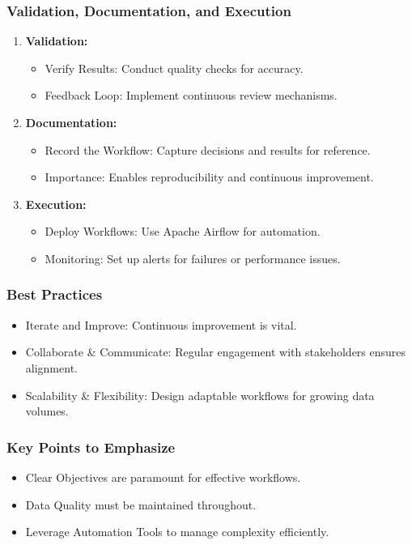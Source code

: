 \documentclass[aspectratio=169]{beamer}
\begin{document}
\begin{frame}[fragile]
    \frametitle{Validation, Documentation, and Execution}
    \begin{enumerate}[resume]
        \item \textbf{Validation:}
        \begin{itemize}
            \item Verify Results: Conduct quality checks for accuracy.
            \item Feedback Loop: Implement continuous review mechanisms.
        \end{itemize}

        \item \textbf{Documentation:}
        \begin{itemize}
            \item Record the Workflow: Capture decisions and results for reference.
            \item Importance: Enables reproducibility and continuous improvement.
        \end{itemize}

        \item \textbf{Execution:}
        \begin{itemize}
            \item Deploy Workflows: Use Apache Airflow for automation.
            \item Monitoring: Set up alerts for failures or performance issues.
        \end{itemize}
    \end{enumerate}
\end{frame}

\begin{frame}[fragile]
    \frametitle{Best Practices}
    \begin{itemize}
        \item Iterate and Improve: Continuous improvement is vital.
        \item Collaborate \& Communicate: Regular engagement with stakeholders ensures alignment.
        \item Scalability \& Flexibility: Design adaptable workflows for growing data volumes.
    \end{itemize}
\end{frame}

\begin{frame}[fragile]
    \frametitle{Key Points to Emphasize}
    \begin{itemize}
        \item Clear Objectives are paramount for effective workflows.
        \item Data Quality must be maintained throughout.
        \item Leverage Automation Tools to manage complexity efficiently.
    \end{itemize}
\end{frame}
\end{document}

